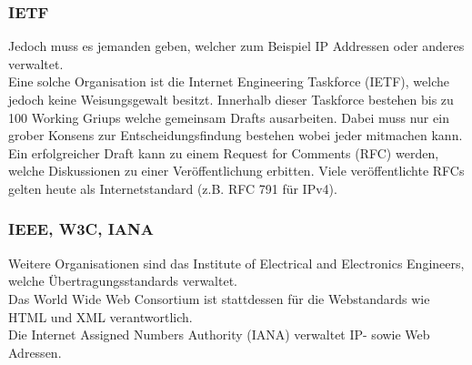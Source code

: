 \documentclass{article}
\begin{document}
	 \subsubsection{IETF}
	 Jedoch muss es jemanden geben, welcher zum Beispiel IP Addressen oder anderes verwaltet. \\
	 Eine solche Organisation ist die Internet Engineering Taskforce (IETF), welche jedoch keine Weisungsgewalt besitzt. Innerhalb dieser Taskforce bestehen bis zu 100 Working Griups welche gemeinsam Drafts ausarbeiten. Dabei muss nur ein grober Konsens zur Entscheidungsfindung bestehen wobei jeder mitmachen kann. \\
	 Ein erfolgreicher Draft kann zu einem Request for Comments (RFC) werden, welche Diskussionen zu einer Veröffentlichung erbitten. Viele veröffentlichte RFCs gelten heute als Internetstandard (z.B. RFC 791 für IPv4).
	 \subsubsection{IEEE, W3C, IANA}
	 Weitere Organisationen sind das Institute of Electrical and Electronics Engineers, welche Übertragungsstandards verwaltet. \\
	 Das World Wide Web Consortium ist stattdessen für die Webstandards wie HTML und XML verantwortlich. \\
	 Die Internet Assigned Numbers Authority (IANA) verwaltet IP- sowie Web Adressen. 
\end{document}
